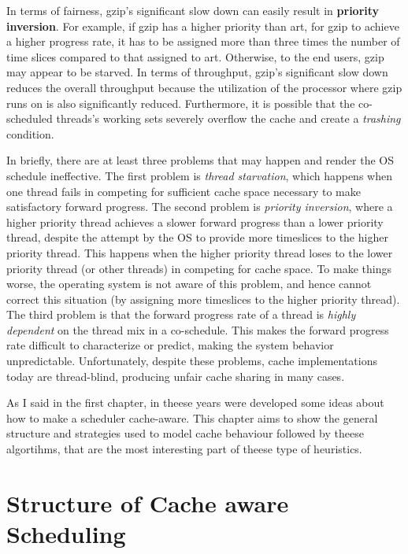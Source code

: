 In terms of fairness, gzip's significant slow down can easily result in \textbf{priority inversion}. 
For example, if gzip has a higher priority than art, for gzip to achieve a higher progress rate, it has to be assigned more than three times the 
number of time slices compared to that assigned to art. Otherwise, to the end users, gzip may appear to be starved. In terms of throughput,
gzip's significant slow down reduces the overall throughput because the utilization of the processor where gzip runs on is also significantly reduced. 
Furthermore, it is possible that the co-scheduled threads's working sets severely overflow the cache and create a \textit{trashing} condition.

In briefly, there are at least three problems that may happen and render the OS schedule ineffective.
The first problem is \textit{thread starvation}, which happens when one thread fails in competing for sufficient cache space necessary to make 
satisfactory forward progress. The second problem is \textit{priority inversion}, where a higher priority thread achieves a slower forward
progress than a lower priority thread, despite the attempt by the OS to provide more timeslices to the higher priority thread.
This happens when the higher priority thread loses to the lower priority thread (or other threads) in competing for cache space. 
To make things worse, the operating system is not aware of this problem, and hence cannot correct this situation (by assigning more timeslices to the 
higher priority thread). The third problem is that the forward progress rate of a thread is \textit{highly dependent} on the thread mix in a co-schedule. 
This makes the forward progress rate difficult to characterize or predict, making the system behavior unpredictable. Unfortunately, despite these problems, 
cache implementations today are thread-blind, producing unfair cache sharing in many cases.

As I said in the first chapter, in theese years were developed some ideas about how to make a scheduler cache-aware.
This chapter aims to show the general structure and strategies used to model cache behaviour followed by theese algortihms, that are the most interesting 
part of theese type of heuristics.

\section{Structure of Cache aware Scheduling}

